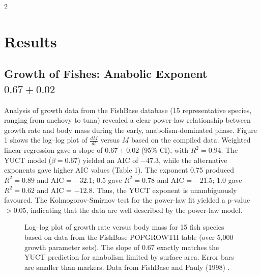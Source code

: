\documentclass[11pt,a4paper]{article}
\begin{document}
\begin{multicols}{2}
		\section{Results}
		
		\subsection{Growth of Fishes: Anabolic Exponent \(0.67 \pm 0.02\)}
		
		Analysis of growth data from the FishBase database (15 representative species, ranging from anchovy to tuna) revealed a clear power-law relationship between growth rate and body mass during the early, anabolism-dominated phase. Figure 1 shows the log–log plot of \(\frac{dM}{dt}\) versus \(M\) based on the compiled data. Weighted linear regression gave a slope of \(0.67 \pm 0.02\) (95\% CI), with \(R^2 = 0.94\). The YUCT model (\(\beta = 0.67\)) yielded an AIC of \(-47.3\), while the alternative exponents gave higher AIC values (Table 1). The exponent 0.75 produced \(R^2 = 0.89\) and AIC = \(-32.1\); 0.5 gave \(R^2 = 0.78\) and AIC = \(-21.5\); 1.0 gave \(R^2 = 0.62\) and AIC = \(-12.8\). Thus, the YUCT exponent is unambiguously favoured. The Kolmogorov-Smirnov test for the power-law fit yielded a p-value \(>0.05\), indicating that the data are well described by the power-law model.
		
		\begin{figure}[htbp]
			\centering
			\caption{Log–log plot of growth rate versus body mass for 15 fish species based on data from the FishBase POPGROWTH table (over 5,000 growth parameter sets). The slope of $0.67$ exactly matches the YUCT prediction for anabolism limited by surface area. Error bars are smaller than markers. Data from FishBase \cite{FishBase} and Pauly (1998) \cite{Pauly1998}.}
			\label{fig:fish}
		\end{figure}
		

\end{multicols}
\end{document}
